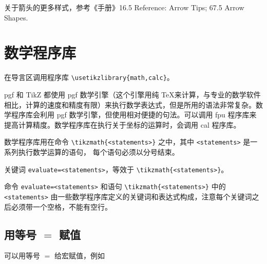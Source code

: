 \documentclass[UTF8]{ctexart}
\begin{document}
{\kaishu \color{red}关于箭头的更多样式，参考《手册》16.5 Reference: Arrow Tips; 67.5 Arrow Shapes.}







\section{数学程序库}

在导言区调用程序库 \verb!\usetikzlibrary{math,calc}!。

pgf 和 TikZ 都使用 pgf 数学引擎（这个引擎用纯 \TeX 来计算，与专业的数学软件相比，计算的速度和精度有限）来执行数学表达式，但是所用的语法非常复杂。数学程序库会利用 pgf 数学引擎，但使用相对便捷的句法。可以调用 fpu 程序库来提高计算精度。数学程序库在执行关于坐标的运算时，会调用 cal 程序库。

数学程序库用在命令 \verb!\tikzmath{<statements>}! 之中，其中 \verb!<statements>! 是一系列执行数学运算的语句，{\color{red} 每个语句必须以分号结束}。

关键词 \verb!evaluate=<statements>!，等效于 \verb!\tikzmath{<statements>}!。

命令 \verb!evaluate=<statements>! 和语句 \verb!\tikzmath{<statements>}! 中的 \verb!<statements>! 由一些数学程序库定义的关键词和表达式构成，注意{\color{red}每个关键词之后必须带一个空格，不能有空行}。



\subsection{用等号 $=$ 赋值}

可以用等号 $=$ 给宏赋值，例如\\
\end{document}
